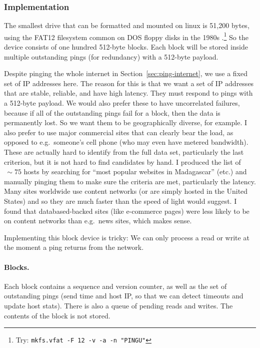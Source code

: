 \documentclass[twocolumn]{article}
\begin{document}
\subsubsection{Implementation}

The smallest drive that can be formatted and mounted on linux is
51,200 bytes, using the FAT12 filesystem common on DOS floppy disks in
the 1980s \cite{wikipediafat12}.\!\footnote{ Try:
  \verb+mkfs.vfat -F 12 -v -a -n "PINGU"+ } So the device consists of
one hundred 512-byte blocks. Each block will be stored inside multiple
outstanding pings (for redundancy) with a 512-byte payload.

Despite pinging the whole internet in Section~\ref{sec:ping-internet},
we use a fixed set of IP addresses here. The reason for this is that
we want a set of IP addresses that are stable, reliable, and have high
latency. They must respond to pings with a 512-byte payload. We would
also prefer these to have uncorrelated failures, because if all of the
outstanding pings fail for a block, then the data is permanently lost.
So we want them to be geographically diverse, for example. I also
prefer to use major commercial sites that can clearly bear the load,
as opposed to e.g.~someone's cell phone (who may even have metered
bandwidth). These are actually hard to identify from the full data
set, particularly the last criterion, but it is not hard to find
candidates by hand. I produced the list of $\,\sim\!75$ hosts by searching for
``most popular websites in Madagascar'' (etc.) and manually pinging
them to make sure the criteria are met, particularly the latency. Many
sites worldwide use content networks (or are simply hosted in the
United States) and so they are much faster than the speed of light
would suggest. I found that databased-backed sites (like e-commerce
pages) were less likely to be on content networks than e.g.~news
sites, which makes sense.


Implementing this block device is tricky: We can only process a read
or write at the moment a ping returns from the network.

\paragraph{Blocks.} Each block contains a sequence and version counter,
as well as the set of outstanding pings (send time and host IP, so that
we can detect timeouts and update host stats). There is also a queue
of pending reads and writes. The contents of the block is not stored.
\end{document}
